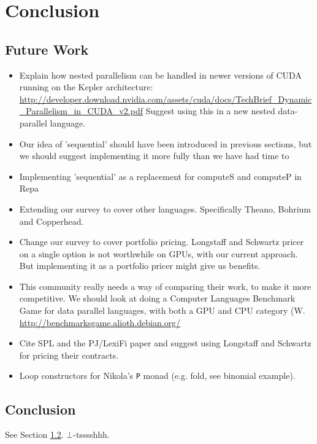 
\chapter{Conclusion}
\label{chap:Conclusion}
\section{Future Work}

\begin{itemize}
\item Explain how nested parallelism can be handled in newer versions
  of CUDA running on the Kepler architecture:
  \url{http://developer.download.nvidia.com/assets/cuda/docs/TechBrief_Dynamic_Parallelism_in_CUDA_v2.pdf}
  Suggest using this in a new nested data-parallel language.

\item Our idea of 'sequential' should have been introduced in previous
  sections, but we should suggest implementing it more fully than we
  have had time to

\item Implementing 'sequential' as a replacement for computeS and
  computeP in Repa

\item Extending our survey to cover other languages. Specifically
  Theano, Bohrium and Copperhead.

\item Change our survey to cover portfolio pricing. Longstaff and
  Schwartz pricer on a single option is not worthwhile on GPUs, with
  our current approach. But implementing it as a portfolio pricer
  might give us benefits.

\item This community really needs a way of comparing their work, to
  make it more competitive. We should look at doing a Computer
  Languages Benchmark Game for data parallel languages, with both a
  GPU and CPU category (W. \url{http://benchmarksgame.alioth.debian.org/}

\item Cite SPL and the PJ/LexiFi paper and suggest using Longstaff and
  Schwartz for pricing their contracts.
\item Loop constructors for Nikola's \texttt{P} monad (e.g. fold, see binomial example).
\end{itemize}

\section{Conclusion}
\label{sec:conclusion}

See Section \ref{sec:conclusion}. $\bot$-tsssshhh.


